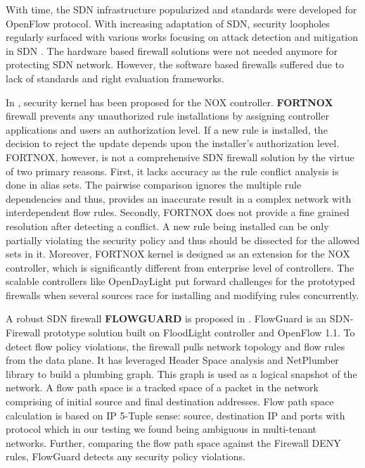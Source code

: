 With time, the SDN infrastructure popularized and standards were developed for OpenFlow protocol. With increasing adaptation of SDN, security loopholes regularly surfaced with various works focusing on attack detection and mitigation in SDN \cite{SDNSURVEY}. The hardware based firewall solutions were not needed anymore for protecting SDN network. However, the software based firewalls suffered due to lack of standards and right evaluation frameworks.

In \cite{FORTNOX}, security kernel has been proposed for the NOX controller. \textbf{FORTNOX} firewall prevents any unauthorized rule installations by assigning controller applications and users an authorization level. If a new rule is installed, the decision to reject the update depends upon the installer's authorization level. FORTNOX, however, is not a comprehensive SDN firewall solution by the virtue of two primary reasons. First, it lacks accuracy as the rule conflict analysis is done in alias sets. The pairwise comparison ignores the multiple rule dependencies and thus, provides an inaccurate result in a complex network with interdependent flow rules. Secondly, FORTNOX does not provide a fine grained resolution after detecting a conflict. A new rule being installed can be only partially violating the security policy and thus should be dissected for the allowed sets in it. Moreover, FORTNOX kernel is designed as an extension for the NOX controller, which is significantly different from enterprise level of controllers. The scalable controllers like OpenDayLight put forward challenges for the prototyped firewalls when several sources race for installing and modifying rules concurrently.
 
A robust SDN firewall \textbf{FLOWGUARD} is proposed in \cite{FLOWGUARD}. FlowGuard is an SDN-Firewall prototype solution built on FloodLight controller and OpenFlow 1.1. To  detect flow policy violations, the firewall pulls network topology and flow rules from the data plane. It has leveraged Header Space analysis \cite{HSA} and NetPlumber library to build a plumbing graph. This graph is used as a logical snapshot of the network. A flow path space is a tracked space of a packet in the network comprising of initial source and final destination addresses. Flow path space calculation is based on IP 5-Tuple sense: source, destination IP and ports with protocol which in our testing we found being ambiguous in multi-tenant networks. Further, comparing the flow path space against the Firewall DENY rules, FlowGuard detects any security policy violations.

